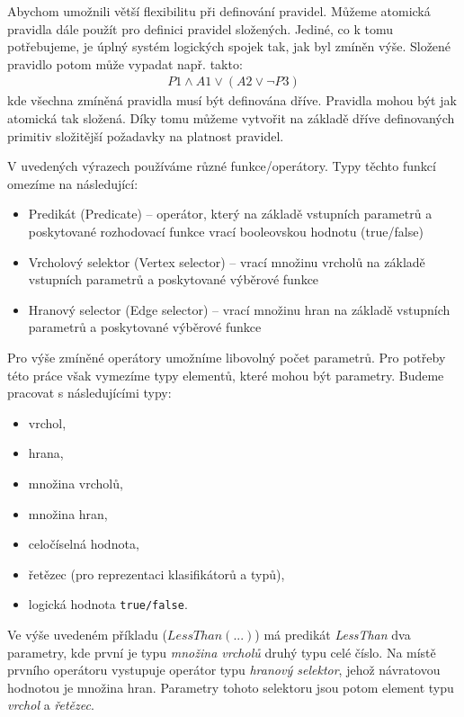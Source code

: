 Abychom umožnili větší flexibilitu při definování pravidel. Můžeme atomická pravidla dále použít pro definici pravidel složených. Jediné, co k tomu potřebujeme, je úplný systém logických spojek tak, jak byl zmíněn výše. Složené pravidlo potom může vypadat např. takto:
\begin{align*}
P1 \wedge A1 \vee ( A2 \vee \neg P3)
\end{align*}
kde všechna zmíněná pravidla musí být definována dříve. Pravidla mohou být jak atomická tak složená. Díky tomu můžeme vytvořit na základě dříve definovaných primitiv složitější požadavky na platnost pravidel.

V uvedených výrazech používáme různé funkce/operátory. Typy těchto funkcí omezíme na následující:

\begin{itemize}
\item Predikát (Predicate) -- operátor, který na základě vstupních parametrů a poskytované rozhodovací funkce vrací booleovskou hodnotu (true/false)
\item Vrcholový selektor (Vertex selector) -- vrací množinu vrcholů na základě vstupních parametrů a poskytované výběrové funkce
\item Hranový selector (Edge selector) -- vrací množinu hran na základě vstupních parametrů a poskytované výběrové funkce
\end{itemize}
Pro výše zmíněné operátory umožníme libovolný počet parametrů. Pro potřeby této práce však vymezíme typy elementů, které mohou být parametry. Budeme pracovat s následujícími typy:

\begin{itemize}
\item vrchol,
\item hrana,
\item množina vrcholů,
\item množina hran,
\item celočíselná hodnota,
\item řetězec (pro reprezentaci klasifikátorů a typů),
\item logická hodnota \verb-true/false-.
\end{itemize}

Ve výše uvedeném příkladu ($LessThan(...)$) má predikát \emph{LessThan} dva parametry, kde první je typu \emph{množina vrcholů} druhý typu celé číslo. Na místě prvního operátoru vystupuje operátor typu \emph{hranový selektor}, jehož návratovou hodnotou je množina hran. Parametry tohoto selektoru jsou potom element typu \emph{vrchol} a \emph{řetězec}.

